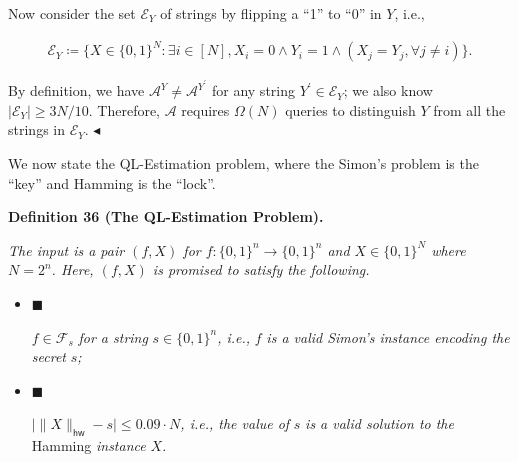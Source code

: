 Now consider the set $\mathcal{E}_{Y}$ of strings by flipping a “1” to “0” in $Y$, i.e.,\par


\[\begin{gathered}
\mathcal{E}_{Y}\coloneqq\{X\in\{0,1\}^{N}:\exists i\in[N],X_{i}=0\land Y_{i}=1\land(X_{j}=Y_{j},\forall j\neq i)\}.
\end{gathered}\]


By definition, we have $\mathcal{A}^{Y}\neq\mathcal{A}^{Y^{\prime}}$ for any string $Y^{\prime}\in\mathcal{E}_{Y}$; we also know $|\mathcal{E}_{Y}|\geq 3N/10$.
Therefore, $\mathcal{A}$ requires $\Omega(N)$ queries to distinguish $Y$ from all the strings in $\mathcal{E}_{Y}$.
$\blacktriangleleft$\par




We now state the QL-Estimation problem, where the Simon’s problem is the “key” and Hamming is the “lock”.\par





\par\medskip\noindent\textbf{
\textbf{Definition 36}\textbf{ }(The QL-Estimation Problem)\textbf{.}
}\par



\emph{The input is a pair $(f,X)$ for $f:\{0,1\}^{n}\rightarrow\{0,1\}^{n}$ and $X\in\{0,1\}^{N}$ where $N=2^{n}$. Here, $(f,X)$ is promised to satisfy the following.}\par


\begin{itemize}


\item[] 
$\blacksquare$ 


$f\in\mathcal{F}_{s}$\emph{ for a string }${s}\in\{0,1\}^{n}$\emph{, i.e., }$f$\emph{ is a valid Simon’s instance encoding the secret }$s$\emph{;}\par





\item[] 
$\blacksquare$ 


$\big|\|X\|_{\mathsf{hw}}-{s}\big|\leq 0.09\cdot N$\emph{, i.e., the value of }${s}$\emph{ is a valid solution to the }Hamming\emph{ instance }$X$\emph{.}\par





\end{itemize}




